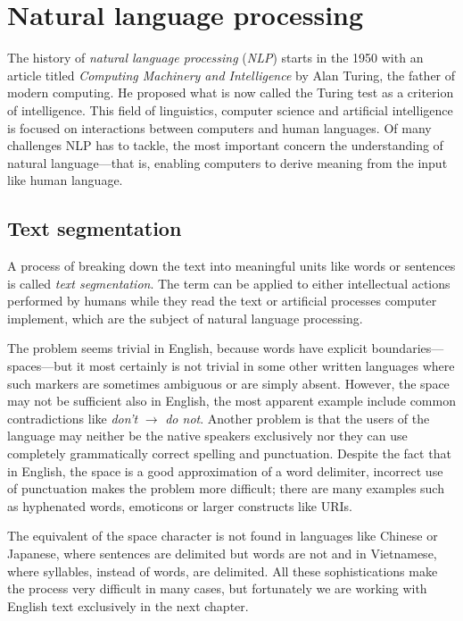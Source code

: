 \chapter{Natural language processing}

  The history of \emph{natural language processing} (\emph{NLP}) starts in the 1950 with an article titled \emph{Computing Machinery and Intelligence} by Alan Turing, the father of modern computing. He proposed what is now called the Turing test as a criterion of intelligence\cite{Turing1950}. This field of linguistics, computer science and artificial intelligence is focused on interactions between computers and human languages. Of many challenges NLP has to tackle, the most important concern the understanding of natural language---that is, enabling computers to derive meaning from the input like human language.

  \section{Text segmentation}

    A process of breaking down the text into meaningful units like words or sentences is called \emph{text segmentation}. The term can be applied to either intellectual actions performed by humans while they read the text or artificial processes computer implement, which are the subject of natural language processing. 

    The problem seems trivial in English, because words have explicit boundaries---spaces---but it most certainly is not trivial in some other written languages where such markers are sometimes ambiguous or are simply absent. However, the space  may not be sufficient also in English, the most apparent example include common contradictions like \emph{don't} $\to$ \emph{do not}.
    Another problem is that the users of the language may neither be the native speakers exclusively nor they can use completely grammatically correct spelling and punctuation. Despite the fact that in English, the space is a good approximation of a word delimiter, incorrect use of punctuation makes the problem more difficult; there are many examples such as hyphenated words, emoticons or larger constructs like URIs.
    
    The equivalent of the space character is not found in languages like Chinese or Japanese, where sentences are delimited but words are not and in Vietnamese, where syllables, instead of words, are delimited. All these sophistications make the process very difficult in many cases, but fortunately we are working with English text exclusively in the next chapter.

